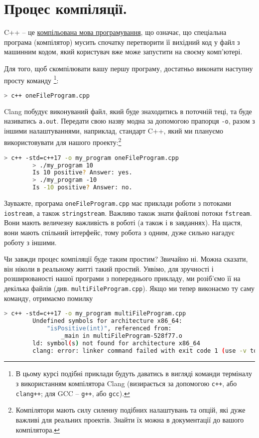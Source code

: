 \documentclass[12pt]{article}
\begin{document}
	\section{Процес компіляції.}

	C++ -- це \href{https://uk.wikipedia.org/wiki/%D0%9A%D0%BE%D0%BC%D0%BF%D1%96%D0%BB%D1%8C%D0%BE%D0%B2%D0%B0%D0%BD%D0%B0_%D0%BC%D0%BE%D0%B2%D0%B0_%D0%BF%D1%80%D0%BE%D0%B3%D1%80%D0%B0%D0%BC%D1%83%D0%B2%D0%B0%D0%BD%D0%BD%D1%8F}{компільована мова програмування}, що означає, що спеціальна програма (компілятор) мусить спочатку перетворити її вихідний код у файл з машинним кодом, який користувач вже може запустити на своєму комп'ютері. 

	Для того, щоб скомпілювати вашу першу програму, достатньо виконати наступну просту команду \footnote{В цьому курсі подібні приклади будуть даватись в вигляді команди терміналу з використанням компілятора Clang (визирається за допомогою \texttt{c++}, або \texttt{clang++}; для GCC --  \texttt{g++}, або \texttt{gcc}).}:
	\begin{lstlisting}[language=bash]
		> c++ oneFileProgram.cpp
	\end{lstlisting}

	Clang побудує виконуваний файл, який буде знаходитись в поточній теці, та буде називатись \texttt{a.out}. Передати свою назву модна за допомогою прапорця \texttt{-o}, разом з іншими налаштуваннями, наприклад, стандарт C++, який ми плануємо використовувати для нашого проекту:\footnote{Компілятори мають силу силенну подібних налаштувань та опцій, які дуже важливі для реальних проектів. Знайти їх можна в документації до вашого компілятора.}
	\begin{lstlisting}[language=bash]
		> c++ -std=c++17 -o my_program oneFileProgram.cpp
		> ./my_program 10
		Is 10 positive? Answer: yes.
		> ./my_program -10
		Is -10 positive? Answer: no.
	\end{lstlisting}

	Зауважте, програма \texttt{oneFileProgram.cpp} має приклади роботи з потоками \texttt{iostream}, а також \texttt{stringstream}. Важливо також знати файлові потоки \texttt{fstream}. Вони мають величезну важливість в роботі (а також і в завданнях). На щастя, вони мають спільний інтерфейс, тому робота з одним, дуже сильно нагадує роботу з іншими.

	Чи завжди процес компіляції буде таким простим? Звичайно ні. Можна сказати, він ніколи в реальному житті такий простий. Уявімо, для зручності і розширюваності нашої програми з попереднього прикладу, ми розіб'ємо її на декілька файлів (див. \texttt{multiFileProgram.cpp}).
	Якщо ми тепер виконаємо ту саму команду, отримаємо помилку
	\begin{lstlisting}[language=bash]
		> c++ -std=c++17 -o my_program multiFileProgram.cpp
		Undefined symbols for architecture x86_64:
			"isPositive(int)", referenced from:
				_main in multiFileProgram-528f77.o
		ld: symbol(s) not found for architecture x86_64
		clang: error: linker command failed with exit code 1 (use -v to see invocation)
	\end{lstlisting}
\end{document}
